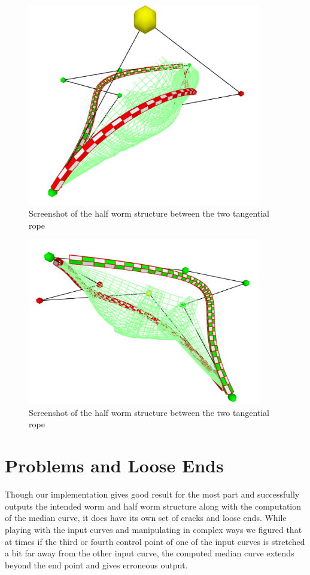 \documentclass[twoside,11pt]{article}
\begin{document}
\begin{figure} [H]
    \centering
    \includegraphics[width=04in]{wormHalf.png}
    \caption{Screenshot of the half worm structure between the two tangential rope}
\end{figure}

\begin{figure} [H]
    \centering
    \includegraphics[width=04in]{wormHalf2.png}
    \caption{Screenshot of the half worm structure between the two tangential rope}
\end{figure}





\section{Problems and Loose Ends}

Though our implementation gives good result for the most part and successfully outputs the intended worm and half worm structure along with the computation of the median curve, it does have its own set of cracks and loose ends. While playing with the input curves and manipulating in complex ways we figured that at times if the third or fourth control point of one of the input curves is stretched a bit far away from the other input curve, the computed median curve extends beyond the end point and gives erroneous output.
\end{document}
